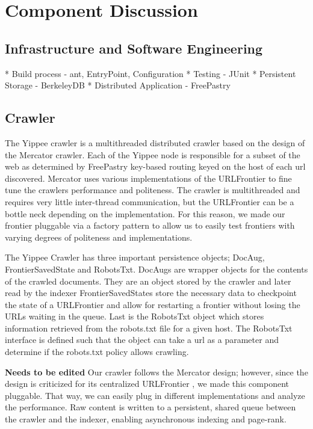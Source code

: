 \documentclass[11pt, letterpaper, oneside, twocolumn]{article}
\begin{document}
\section{Component Discussion}
\label{sec:component}



\subsection{Infrastructure and Software Engineering}

* Build process - ant, EntryPoint, Configuration
* Testing - JUnit
* Persistent Storage - BerkeleyDB
* Distributed Application - FreePastry 

\subsection{Crawler}

The Yippee crawler is a multithreaded distributed crawler based on the design of the Mercator crawler\cite{mercator}. 
Each of the Yippee node is responsible for a subset of the web as determined by FreePastry key-based routing keyed on the host of each url discovered.
Mercator uses various implementations of the URLFrontier to fine tune the crawlers performance and politeness.
The crawler is multithreaded and requires very little inter-thread communication, but the URLFrontier can be a bottle neck depending on the implementation.
For this reason, we made our frontier pluggable via a factory pattern to allow us to easily test frontiers with varying degrees of politeness and implementations.


The Yippee Crawler has three important persistence objects; DocAug, FrontierSavedState and RobotsTxt.
DocAugs are wrapper objects for the contents of the crawled documents.
They are an object stored by the crawler and later read by the indexer
FrontierSavedStates store the necessary data to checkpoint the state of a URLFrontier and allow for restarting a frontier without losing the URLs waiting in the queue.
Last is the RobotsTxt object which stores information retrieved from the robots.txt file for a given host.
The RobotsTxt interface is defined such that the object can take a url as a parameter and determine if the robots.txt policy allows crawling.


\textbf{Needs to be edited}
Our crawler follows the Mercator design; however, since the design is
criticized for its centralized URLFrontier , we made this
component pluggable. That  way, we can easily plug in different implementations 
and analyze the  performance. Raw content  is  written to a persistent, shared queue  
between the crawler and  the indexer, enabling
asynchronous indexing and page-rank.
\end{document}
